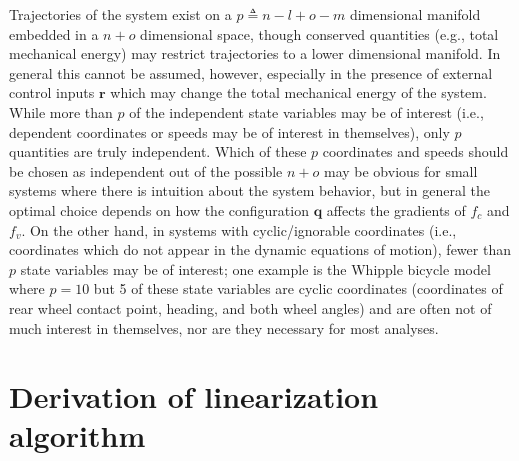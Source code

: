 \documentclass{svjour3}                     %
\begin{document}
Trajectories of the system exist on a $p \triangleq n - l + o - m$ dimensional
manifold embedded in a $n + o$ dimensional space, though conserved quantities
(e.g., total mechanical energy) may restrict trajectories to a lower
dimensional manifold.  In general this cannot be assumed, however, especially
in the presence of external control inputs $\bm{r}$ which may change the total
mechanical energy of the system.  While more than $p$ of the independent state
variables may be of interest (i.e., dependent coordinates or speeds may be of
interest in themselves), only $p$ quantities are truly independent.  Which of
these $p$ coordinates and speeds should be chosen as independent out of the
possible $n + o$ may be obvious for small systems where there is intuition
about the system behavior, but in general the optimal choice depends on how the
configuration $\bm{q}$ affects the gradients of $f_c$ and $f_v$.  On the other
hand, in systems with cyclic/ignorable coordinates (i.e., coordinates which do
not appear in the dynamic equations of motion), fewer than $p$ state
variables may be of interest; one example is the Whipple bicycle model where
$p=10$ but 5 of these state variables are cyclic coordinates (coordinates of
rear wheel contact point, heading, and both wheel angles) and are often not of
much interest in themselves, nor are they necessary for most analyses.

\section{Derivation of linearization algorithm}
\label{derivations}
\end{document}

